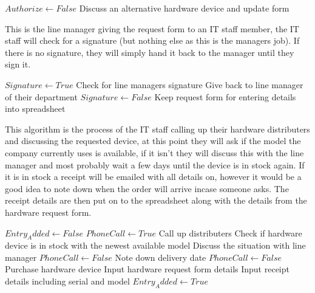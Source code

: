 \begin{algorithm}[H]
\begin{algorithmic}
\State$Authorize \leftarrow False$
		\State Discuss an alternative hardware device and update form
	\Else
	\EndIf
\EndWhile
\end{algorithmic}
\end{algorithm}

This is the line manager giving the request form to an IT staff member, the IT staff will check for a signature (but nothing else as this is the managers job). If there is no signature, they will simply hand it back to the manager until they sign it.

\begin{algorithm}[H]
\begin{algorithmic}
\State $Signature  \leftarrow True$
	\State Check for line managers signature
		\State Give back to line manager of their department
		\State $Signature  \leftarrow False$
	\Else
		\State Keep request form for entering details into spreadsheet
\EndIf
\EndWhile
\end{algorithmic}
\end{algorithm}

This algorithm is the process of the IT staff calling up their hardware distributers and discussing the requested device, at this point they will ask if the model the company currently uses is available, if it isn't they will discuss this with the line manager and most probably wait a few days until the device is in stock again. If it is in stock a receipt will be emailed with all details on, however it would be a good idea to note down when the order will arrive incase someone asks. The receipt details are then put on to the spreadsheet along with the details from the hardware request form.

\begin{algorithm}[H]
\begin{algorithmic}
\State $Entry_Added \leftarrow False$
\State $PhoneCall \leftarrow True$
		\State Call up distributers
		\State Check if hardware device is in stock with the newest available model
			\State Discuss the situation with line manager
			\State  $PhoneCall \leftarrow False$
		\Else
			\State Note down delivery date
			\State  $PhoneCall \leftarrow False$
		\EndIf
	\EndWhile
	\State Purchase hardware device
	\State Input hardware request form details
	\State Input receipt details including serial and model
	\State $Entry_Added \leftarrow True$
\EndWhile
\end{algorithmic}
\end{algorithm}

